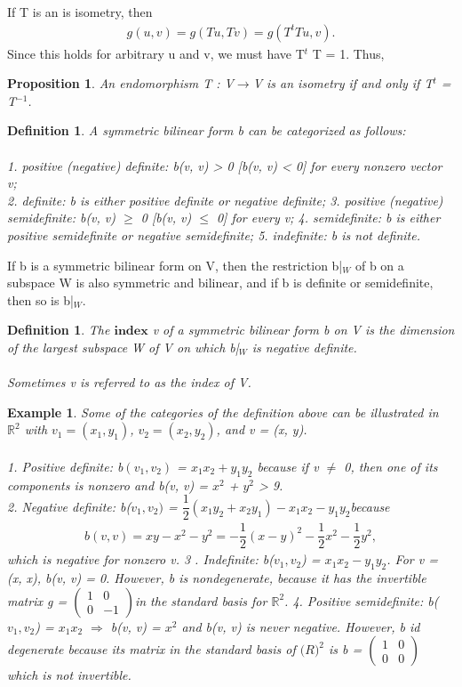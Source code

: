 \documentclass[12pt,a4paper]{article}
\newtheorem{defn}[thm]{Definition}
\newtheorem{exmp}{Example}[section]
\newtheorem{prop}{Proposition}
\begin{document}
If T is an is isometry, then
\begin{eqnarray*}
g(u, v) = g(Tu, Tv) = g(T^t Tu, v).
\end{eqnarray*}
Since this holds for arbitrary u and v, we must have T$^t$
T = 1. Thus,
\begin{prop}
An endomorphism T : V$\to$V is an isometry if and only
if T$^t$ = T$^{-1}$.
\end{prop}
\begin{defn} 
A symmetric bilinear form b can be categorized as follows:
\\\\
1. positive (negative) definite: b(v, v) > 0 [b(v, v) < 0] for every
nonzero vector v;\\
2. definite: b is either positive definite or negative definite;
3. positive (negative) semidefinite: b(v, v) $\geq$ 0 [b(v, v) $\leq$ 0] for every v;
4. semidefinite: b is either positive semidefinite or negative semidefinite;
5. indefinite: b is not definite.
\end{defn}
If b is a symmetric bilinear form on V, then the restriction b|$_W$ of b on a
subspace W is also symmetric and bilinear, and if b is definite or semidefinite, then so is b|$_W$.
\begin{defn}
The $\textbf{index}$ v of a symmetric bilinear form b on V is the
dimension of the largest subspace W of V on which b|$_W$ is negative definite.\\\\
Sometimes v is referred to as the index of V.
\end{defn}
\begin{exmp}
Some of the categories of the definition above can be illustrated in $\mathbb{R}^2$ with $v_1 = (x_1, y_1)$, $v_2 = (x_2, y_2)$, and v = (x, y).\\\\
1. Positive definite: b$(v_1, v_2)$ = $x_1 x_2 + y_1 y_2$ because if v $\ne$ 0, then one of its components is nonzero and b(v, v) = $x^2$ + $y^2$ > 9. \\
2. Negative definite: b($v_1, v_2)$ = $\dfrac{1}{2}(x_1 y_2 + x_2 y_1) - x_1 x_2 - y_1 y_2 $because 
\begin{eqnarray*}
b(v, v) = x y - x^2 - y^2 = - \dfrac{1}{2}(x - y)^2 - \dfrac{1}{2}x^2 -\dfrac{1}{2} y^2,
\end{eqnarray*}
which is negative for nonzero v.
3 . Indefinite: b($v_1,v_2$) = $x_1 x_2 - y_1 y_2$. For v = (x, x), b(v, v) = 0. However, b is nondegenerate, because it has the invertible matrix g = 
$\begin{pmatrix}
1 & 0 \\
0 & -1 
\end{pmatrix} $in the standard basis for $\mathbb{R}^2$.
4. Positive semidefinite: b($v_1, v_2$) = $x_1 x_2$ $\Rightarrow$ b(v, v) = $x ^2$ and b(v, v) is never negative. However, b id degenerate because its matrix in the standard basis of $\mathbb(R)^2$ is b = 
$\begin{pmatrix}
1 & 0\\
0 & 0
\end{pmatrix}$
which is not invertible.
\end{exmp}
\end{document}
